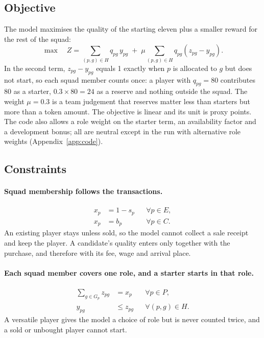 \subsection{Objective}

The model maximises the quality of the starting eleven plus a smaller reward for the rest of the squad:
\begin{equation}\label{eq:objective}
\max \quad Z = \sum_{(p,g) \in H} q_{pg}\, y_{pg} \; + \; \mu \sum_{(p,g) \in H} q_{pg} \left( z_{pg} - y_{pg} \right).
\end{equation}
In the second term, $z_{pg} - y_{pg}$ equals 1 exactly when $p$ is allocated to $g$ but does not start, so each squad member counts once: a player with $q_{pg} = 80$ contributes 80 as a starter, $0.3 \times 80 = 24$ as a reserve and nothing outside the squad. The weight $\mu = 0.3$ is a team judgement that reserves matter less than starters but more than a token amount. The objective is linear and its unit is proxy points. The code also allows a role weight on the starter term, an availability factor and a development bonus; all are neutral except in the run with alternative role weights (Appendix~\ref{app:code}).

\subsection{Constraints}

\paragraph{Squad membership follows the transactions.}
\begin{align}
x_p &= 1 - s_p && \forall p \in E, \label{eq:linkE}\\
x_p &= b_p && \forall p \in C. \label{eq:linkC}
\end{align}
An existing player stays unless sold, so the model cannot collect a sale receipt and keep the player. A candidate's quality enters only together with the purchase, and therefore with its fee, wage and arrival place.

\paragraph{Each squad member covers one role, and a starter starts in that role.}
\begin{align}
\sum_{g \in G_p} z_{pg} &= x_p && \forall p \in P, \label{eq:onerole}\\
y_{pg} &\le z_{pg} && \forall (p,g) \in H. \label{eq:start}
\end{align}
A versatile player gives the model a choice of role but is never counted twice, and a sold or unbought player cannot start.

